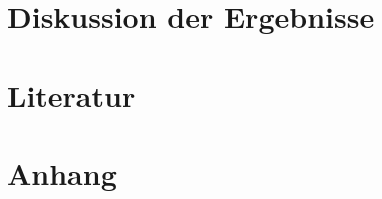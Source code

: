 \documentclass[11pt,a4paper]{article}
\begin{document}
\section{Diskussion der Ergebnisse}

\section{Literatur}

\section{Anhang}
\end{document}
